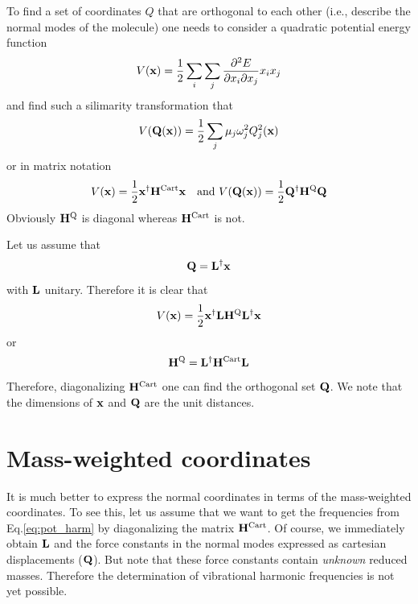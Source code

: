 \documentclass[a4paper,titlepage,twoside,fleqn,12pt]{book}
\begin{document}
\begin{appendices}
To find a set of coordinates $Q$ that are orthogonal to each other (i.e., describe the normal 
modes of the molecule) one needs to consider a quadratic potential energy function
\begin{equation}
V({\bf x}) = \frac{1}{2} \sum_i\sum_j \frac{\partial^2 E}{\partial x_i \partial x_j} x_i x_j
\end{equation}
and find such a silimarity transformation that
\begin{equation}\label{eq:pot_harm}
V({\bf Q}({\bf x})) = \frac{1}{2} \sum_j \mu_j \omega_j^2 Q_j^2({\bf x})
\end{equation}
or in matrix notation
\begin{equation}
V({\bf x}) = \frac{1}{2} {\bf x}^{\dagger} {\bf H}^{\rm Cart} {\bf x}  \quad \textrm{and   } V({\bf Q}({\bf x})) = \frac{1}{2} {\bf Q}^{\dagger} {\bf H}^{\rm Q} {\bf Q} 
\end{equation}
Obviously ${\bf H}^{\rm Q}$ is diagonal whereas ${\bf H}^{\rm Cart}$ is not. 

Let us assume that
\begin{equation}
{\bf Q} = {\bf L}^{\dagger} {\bf x}
\end{equation}
with ${\bf L}$ unitary.
Therefore it is clear that
\begin{equation}
V({\bf x}) = \frac{1}{2} {\bf x}^{\dagger} {\bf L} {\bf H}^{\rm Q} {\bf L}^{\dagger} {\bf x}
\end{equation}
or
\begin{equation}
{\bf H}^{\rm Q} = {\bf L}^{\dagger} {\bf H}^{\rm Cart} {\bf L}
\end{equation}
Therefore, diagonalizing ${\bf H}^{\rm Cart}$ one can find the orthogonal 
set ${\bf Q}$. We note that the dimensions of ${\bf x}$ and ${\bf Q}$ are the unit distances.

\section{Mass-weighted coordinates\label{a:mw-coord}}

It is much better to express the normal coordinates in terms of the mass-weighted coordinates.
To see this, let us assume that we want to get the frequencies from Eq.\eqref{eq:pot_harm} by diagonalizing
the matrix ${\bf H}^{\rm Cart}$. Of course, we immediately obtain ${\bf L}$ and the force constants
in the normal modes expressed as cartesian displacements (${\bf Q}$). But note that these force constants 
contain \emph{unknown} reduced masses.
Therefore the determination of vibrational harmonic frequencies is not yet possible. 


\end{appendices}
\end{document}
